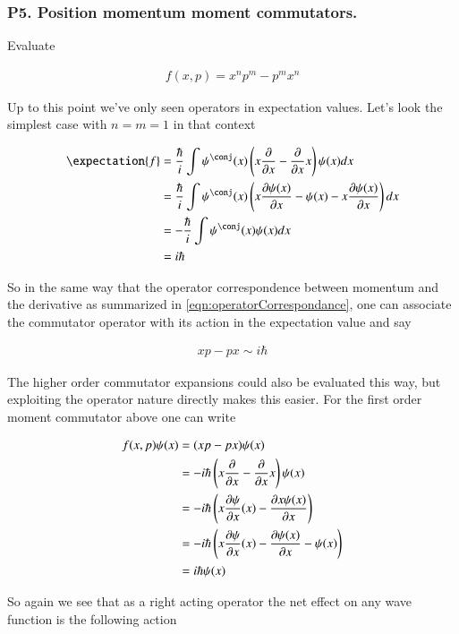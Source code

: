 \documentclass{article}
\begin{document}
\subsubsection{P5. Position momentum moment commutators. }

Evaluate

\begin{align*}
f(x,p) = x^n p^m - p^m x^n
\end{align*}

Up to this point we've only seen operators in expectation values.  Let's look the simplest case with $n = m = 1$ in that
context

\begin{align*}
\expectation{f} 
&= \frac{\hbar}{i} \int \psi^\conj(x) \left(x \PD{x}{} - \PD{x}{} x \right) \psi(x) dx \\
&= \frac{\hbar}{i} \int \psi^\conj(x) \left(x \PD{x}{\psi(x)} - \psi(x) - x \PD{x}{\psi(x)} \right) dx \\
&= -\frac{\hbar}{i} \int \psi^\conj(x) \psi(x) dx \\
&= {i\hbar}
\end{align*}

So in the same way that the operator correspondence between momentum and the derivative as summarized in 
\ref{eqn:operatorCorrespondance}, one can associate the commutator operator with its action in the expectation value and
say

\begin{align}\label{eqn:commutator}
x p - p x \sim  i\hbar
\end{align}

The higher order commutator expansions could also be evaluated this way, but exploiting the operator nature directly 
makes this easier.  For the first order moment commutator above one can write

\begin{align*}
f(x,p) \psi(x) 
&= (x p - p x) \psi(x) \\
&= -i \hbar \left(x \PD{x}{} - \PD{x}{} x\right) \psi(x) \\
&= -i \hbar \left(x \PD{x}{\psi}(x) - \PD{x}{x \psi(x)} \right) \\
&= -i \hbar \left(x \PD{x}{\psi}(x) - \PD{x}{\psi(x)} -\psi(x) \right) \\
&= i \hbar \psi(x) \\
\end{align*}

So again we see that as a right acting operator the net effect on any wave function is the following action
\end{document}
